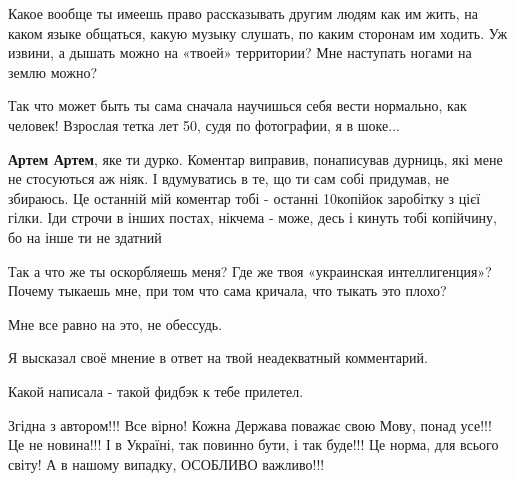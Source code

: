 \begin{itemize}
\begin{itemize}
Какое вообще ты имеешь право рассказывать другим людям как им жить, на каком
языке общаться, какую музыку слушать, по каким сторонам им ходить. Уж извини, а
дышать можно на «твоей» территории? Мне наступать ногами на землю можно?

 
Так что может быть ты сама сначала научишься себя вести нормально, как человек!
Взрослая тетка лет 50, судя по фотографии, я в шоке...

 
\textbf{Артем Артем}, яке ти дурко. Коментар виправив, понаписував дурниць, які мене не стосуються аж ніяк. І вдумуватись в те, що ти сам собі придумав, не збираюсь. Це останній мій коментар тобі - останні 10копійок заробітку з цієї гілки. Іди строчи в інших постах, нікчема - може, десь і кинуть тобі копійчину, бо на інше ти не здатний

 
Так а что же ты оскорбляешь меня? Где же твоя «украинская интеллигенция»?
Почему тыкаешь мне, при том что сама кричала, что тыкать это плохо?

 
Мне все равно на это, не обессудь.

Я высказал своё мнение в ответ на твой неадекватный комментарий.

Какой написала - такой фидбэк к тебе прилетел.

\end{itemize}

 

Згідна з автором!!! Все вірно! Кожна Держава поважає свою Мову, понад усе!!! Це
не новина!!! І в Україні, так повинно бути, і так буде!!! Це норма, для всього
світу! А в нашому випадку, ОСОБЛИВО важливо!!!

\end{itemize}

